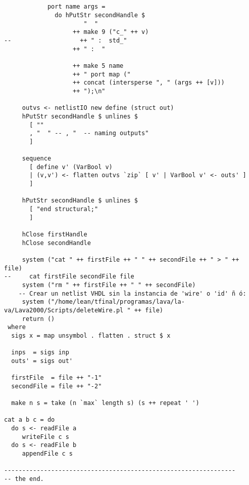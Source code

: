 \begin{lstlisting}[mathescape=false]
            

            port name args =
              do hPutStr secondHandle $
                      "  "
                   ++ make 9 ("c_" ++ v)
--                   ++ " :  std_"
                   ++ " :  "

                   ++ make 5 name
                   ++ " port map ("
                   ++ concat (intersperse ", " (args ++ [v]))
                   ++ ");\n"    

     outvs <- netlistIO new define (struct out)
     hPutStr secondHandle $ unlines $
       [ ""
       , "  " -- , "  -- naming outputs"
       ]
     
     sequence
       [ define v' (VarBool v)
       | (v,v') <- flatten outvs `zip` [ v' | VarBool v' <- outs' ]
       ]
     
     hPutStr secondHandle $ unlines $
       [ "end structural;"
       ]
     
     hClose firstHandle
     hClose secondHandle
     
     system ("cat " ++ firstFile ++ " " ++ secondFile ++ " > " ++ file)
--     cat firstFile secondFile file
     system ("rm " ++ firstFile ++ " " ++ secondFile)
    -- Crear un netlist VHDL sin la instancia de 'wire' o 'id' ñ ó:
     system ("/home/lean/tfinal/programas/lava/la-va/Lava2000/Scripts/deleteWire.pl " ++ file)
     return ()
 where
  sigs x = map unsymbol . flatten . struct $ x
  
  inps  = sigs inp
  outs' = sigs out'
 
  firstFile  = file ++ "-1"
  secondFile = file ++ "-2"

  make n s = take (n `max` length s) (s ++ repeat ' ')

cat a b c = do
  do s <- readFile a
     writeFile c s
  do s <- readFile b
     appendFile c s

----------------------------------------------------------------
-- the end.

\end{lstlisting}


